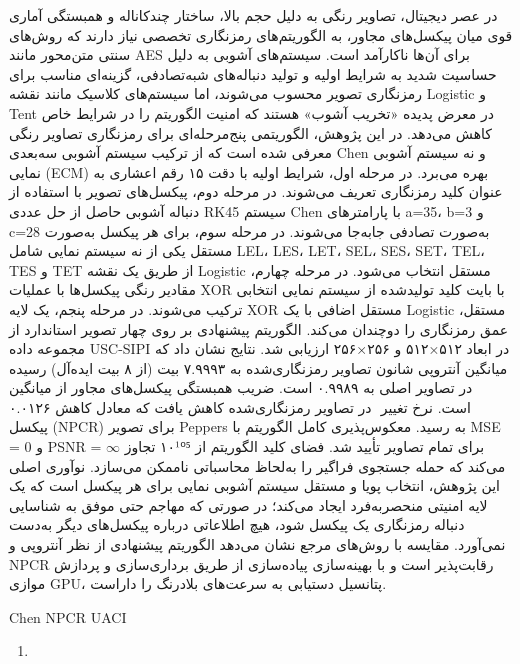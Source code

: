در عصر دیجیتال، تصاویر رنگی به دلیل حجم بالا، ساختار چندکاناله و همبستگی آماری قوی میان پیکسل‌های مجاور، به الگوریتم‌های رمزنگاری تخصصی نیاز دارند که روش‌های سنتی متن‌محور مانند AES برای آن‌ها ناکارآمد است. سیستم‌های آشوبی به دلیل حساسیت شدید به شرایط اولیه و تولید دنباله‌های شبه‌تصادفی، گزینه‌ای مناسب برای رمزنگاری تصویر محسوب می‌شوند، اما سیستم‌های کلاسیک مانند نقشه Logistic و Tent در معرض پدیده «تخریب آشوب» هستند که امنیت الگوریتم را در شرایط خاص کاهش می‌دهد. در این پژوهش، الگوریتمی پنج‌مرحله‌ای برای رمزنگاری تصاویر رنگی معرفی شده است که از ترکیب سیستم آشوبی سه‌بعدی Chen و نه سیستم آشوبی نمایی (ECM) بهره می‌برد. در مرحله اول، شرایط اولیه با دقت ۱۵ رقم اعشاری به عنوان کلید رمزنگاری تعریف می‌شوند. در مرحله دوم، پیکسل‌های تصویر با استفاده از دنباله آشوبی حاصل از حل عددی RK45 سیستم Chen با پارامترهای a=35، b=3 و c=28 به‌صورت تصادفی جابه‌جا می‌شوند. در مرحله سوم، برای هر پیکسل به‌صورت مستقل یکی از نه سیستم نمایی شامل LEL، LES، LET، SEL، SES، SET، TEL، TES و TET از طریق یک نقشه Logistic مستقل انتخاب می‌شود. در مرحله چهارم، مقادیر رنگی پیکسل‌ها با عملیات XOR با بایت کلید تولیدشده از سیستم نمایی انتخابی ترکیب می‌شوند. در مرحله پنجم، یک لایه XOR مستقل اضافی با یک Logistic مستقل، عمق رمزنگاری را دوچندان می‌کند. الگوریتم پیشنهادی بر روی چهار تصویر استاندارد از مجموعه داده USC-SIPI در ابعاد ۵۱۲×۵۱۲ و ۲۵۶×۲۵۶ ارزیابی شد. نتایج نشان داد که میانگین آنتروپی شانون تصاویر رمزنگاری‌شده به ۷.۹۹۹۳ بیت (از ۸ بیت ایده‌آل) رسیده است. ضریب همبستگی پیکسل‌های مجاور از میانگین ‎۰.۹۹۸۹‎ در تصاویر اصلی به ‎۰.۰۱۲۶‎ در تصاویر رمزنگاری‌شده کاهش یافت که معادل کاهش ‎‎ است. نرخ تغییر پیکسل (NPCR) برای تصویر Peppers به  رسید. معکوس‌پذیری کامل الگوریتم با MSE = 0 و PSNR = $\infty$ برای تمام تصاویر تأیید شد. فضای کلید الگوریتم از ۱۰¹⁰⁵ تجاوز می‌کند که حمله جستجوی فراگیر را به‌لحاظ محاسباتی ناممکن می‌سازد. نوآوری اصلی این پژوهش، انتخاب پویا و مستقل سیستم آشوبی نمایی برای هر پیکسل است که یک لایه امنیتی منحصربه‌فرد ایجاد می‌کند؛ در صورتی که مهاجم حتی موفق به شناسایی دنباله رمزنگاری یک پیکسل شود، هیچ اطلاعاتی درباره پیکسل‌های دیگر به‌دست نمی‌آورد. مقایسه با روش‌های مرجع نشان می‌دهد الگوریتم پیشنهادی از نظر آنتروپی و NPCR رقابت‌پذیر است و با بهینه‌سازی پیاده‌سازی از طریق برداری‌سازی و پردازش موازی GPU، پتانسیل دستیابی به سرعت‌های بلادرنگ را داراست.

 Chen NPCR UACI

\RL{\hfill\break
}

\begin{enumerate}
\def\labelenumi{\arabic{enumi}.}
\item
  \protect{}\label{_Toc232899850}{}
\end{enumerate}


